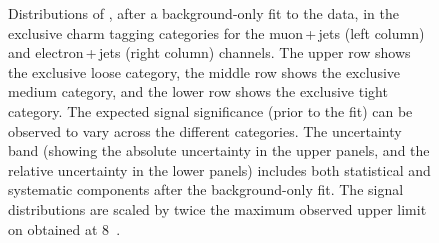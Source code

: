 \begin{figure}
\caption{Distributions of \mjj, after a background-only fit to the
    data, in the exclusive charm tagging categories for the muon\,+\,jets
    (left column) and electron\,+\,jets (right column) channels.
    The upper row shows the exclusive loose category, the middle row
    shows the exclusive medium category, and the lower row shows the
    exclusive tight category. The expected signal significance (prior
    to the fit) can be observed to vary across the different
    categories. The uncertainty band (showing the absolute
    uncertainty in the upper panels, and the relative uncertainty in
    the lower panels)
    includes both statistical and systematic components after
    the background-only fit. The signal distributions are scaled by twice the
    maximum observed upper limit on \Bthb
    obtained at 8\TeV~\cite{Khachatryan:2015uua}.}
\label{fig:mjj_cTagEx}
\end{figure}

